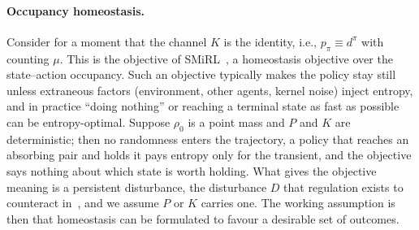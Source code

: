 \documentclass[11pt]{article}
\theoremstyle{remark}
\newcommand{\1}{\mathds{1}}
\newcommand{\occ}{d^{\pi}}
\newcommand{\pz}{p_{\pi}}
\begin{document}
\paragraph{Occupancy homeostasis.}
Consider for a moment that the channel $K$ is the identity, i.e., $\pz\equiv\occ$ with counting $\mu$.
This is the objective of SMiRL~\citep{Berseth-smirl21}, a homeostasis objective over the state--action occupancy.
Such an objective typically makes the policy stay still unless extraneous factors (environment, other agents, kernel noise) inject entropy, and in practice ``doing nothing'' or reaching a terminal state as fast as possible can be entropy-optimal.
Suppose $\rho_0$ is a point mass and $P$ and $K$ are deterministic; then no randomness enters the trajectory, a policy that reaches an absorbing pair and holds it pays entropy only for the transient, and the objective says nothing about which state is worth holding.
What gives the objective meaning is a persistent disturbance, the disturbance $D$ that regulation exists to counteract in~\citet{Conant-good70}, and we assume $P$ or $K$ carries one.
The working assumption is then that homeostasis can be formulated to favour a desirable set of outcomes.
\end{document}
